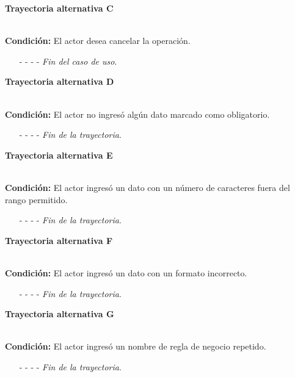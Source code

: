\hypertarget{CU8-1:TAC}{\textbf{Trayectoria alternativa C}}\\
\noindent \textbf{Condición:} El actor desea cancelar la operación.
\begin{enumerate}
	\UCpaso[\UCactor] Solicita cancelar la operación oprimiendo el botón  de la pantalla 
	\UCpaso[\UCsist] Muestra la pantalla .
	\item[- -] - - {\em {Fin del caso de uso}}.%
\end{enumerate}
\hypertarget{CU8-1:TAD}{\textbf{Trayectoria alternativa D}}\\
\noindent \textbf{Condición:} El actor no ingresó algún dato marcado como obligatorio.
\begin{enumerate}
	\UCpaso[\UCsist] Muestra el mensaje  señalando el campo que presenta el error en la pantalla .
	\UCpaso Regresa al paso \ref{CU8.1-P3} de la trayectoria principal.
	\item[- -] - - {\em {Fin de la trayectoria}}.%
\end{enumerate}
\hypertarget{CU8-1:TAE}{\textbf{Trayectoria alternativa E}}\\
\noindent \textbf{Condición:} El actor ingresó un dato con un número de caracteres fuera del rango permitido.
\begin{enumerate}
	\UCpaso[\UCsist] Muestra el mensaje  señalando el campo que presenta el error en la pantalla .
	\UCpaso Regresa al paso \ref{CU8.1-P3} de la trayectoria principal.
	\item[- -] - - {\em {Fin de la trayectoria}}.%
\end{enumerate}
\hypertarget{CU8-1:TAF}{\textbf{Trayectoria alternativa F}}\\
\noindent \textbf{Condición:} El actor ingresó un dato con un formato incorrecto.
\begin{enumerate}
	\UCpaso[\UCsist] Muestra el mensaje  señalando el campo que presenta el error en la pantalla .
	\UCpaso Regresa al paso \ref{CU8.1-P3} de la trayectoria principal.
	\item[- -] - - {\em {Fin de la trayectoria}}.
\end{enumerate}
\hypertarget{CU8-1:TAG}{\textbf{Trayectoria alternativa G}}\\
\noindent \textbf{Condición:} El actor ingresó un nombre de regla de negocio repetido.
\begin{enumerate}
	\UCpaso[\UCsist] Muestra el mensaje  señalando el campo que presenta la duplicidad en la pantalla .
	\UCpaso Regresa al paso \ref{CU8.1-P3} de la trayectoria principal.
	\item[- -] - - {\em {Fin de la trayectoria}}.
\end{enumerate}
